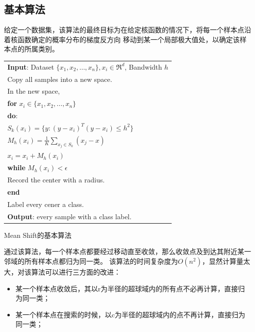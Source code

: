 \documentclass{article}
\begin{document}
\subsection{基本算法}
给定一个数据集，该算法的最终目标为在给定核函数的情况下，将每一个样本点沿着核函数确定的概率分布的梯度反方向
移动到某一个局部极大值处，以确定该样本点的所属类别。\\

\begin{center}
\begin{tabular}{l}
    \hline 
    \hline
    \textbf{Input}: Dataset {$ \{x_1, x_2, \ldots, x_n\}, x_i \in {\Re}^d $}, Bandwidth $h$\\
    Copy all samples into a new space. \\
    In the new space, \\
    \textbf{for} $ x_i \in \{x_1, x_2, \ldots, x_n \} $\\
    \quad \quad \textbf{do}: \\
    \quad \quad \quad \quad $ S_k(x_i) = \{y: (y-x_i)^T(y-x_i) \le h^2 \} $ \\
    \quad \quad \quad \quad $ M_h(x_i) = \frac{1}{K} {\sum}_{x_j \in S_k} (x_j - x) $ \\
    \quad \quad \quad \quad $ x_i = x_i + M_h(x_i) $ \\
    \quad \quad \textbf{while} $ M_h(x_i) < \epsilon $ \\
    \quad \quad Record the center with a radius. \\
    \textbf{end} \\
    Label every cener a class. \\
    \textbf{Output}: every sample with a class label. \\
    \hline 
    \hline
\end{tabular}

Mean Shift的基本算法
\end{center}

通过该算法，每一个样本点都要经过移动直至收敛，那么收敛点及到达其附近某一邻域的所有样本点都归为同一类。
该算法的时间复杂度为$ O(n^2) $，显然计算量太大，对该算法可以进行三方面的改进：
\begin{itemize}
    \item 某一个样本点收敛后，其以r为半径的超球域内的所有点不必再计算，直接归为同一类；
    \item 某一个样本点在搜索的时候，以c为半径的超球域内的点不再计算，直接归为同一类；
\end{itemize}
\end{document}

